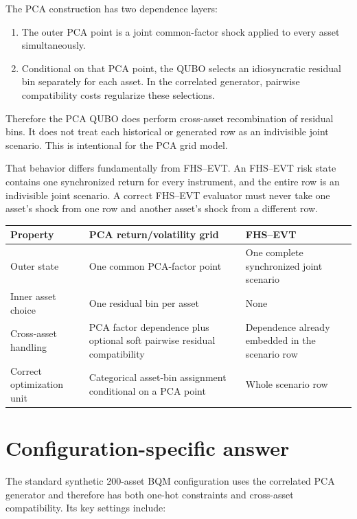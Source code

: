 \documentclass[11pt,a4paper]{article}
\begin{document}
The PCA construction has two dependence layers:

\begin{enumerate}
  \item The outer PCA point is a joint common-factor shock applied to every
  asset simultaneously.
  \item Conditional on that PCA point, the QUBO selects an idiosyncratic
  residual bin separately for each asset. In the correlated generator, pairwise
  compatibility costs regularize these selections.
\end{enumerate}

Therefore the PCA QUBO does perform cross-asset recombination of residual bins.
It does not treat each historical or generated row as an indivisible joint
scenario. This is intentional for the PCA grid model.

That behavior differs fundamentally from FHS--EVT. An FHS--EVT risk state
contains one synchronized return for every instrument, and the entire row is an
indivisible joint scenario. A correct FHS--EVT evaluator must never take one
asset's shock from one row and another asset's shock from a different row.

\begin{center}
\begin{tabular}{@{}p{}p{}p{}@{}}
\toprule
Property & PCA return/volatility grid & FHS--EVT \\
\midrule
Outer state
& One common PCA-factor point
& One complete synchronized joint scenario \\
Inner asset choice
& One residual bin per asset
& None \\
Cross-asset handling
& PCA factor dependence plus optional soft pairwise residual compatibility
& Dependence already embedded in the scenario row \\
Correct optimization unit
& Categorical asset-bin assignment conditional on a PCA point
& Whole scenario row \\
\bottomrule
\end{tabular}
\end{center}

\section{Configuration-specific answer}

The standard synthetic 200-asset BQM configuration uses the correlated PCA
generator and therefore has both one-hot constraints and cross-asset
compatibility. Its key settings include:
\end{document}
